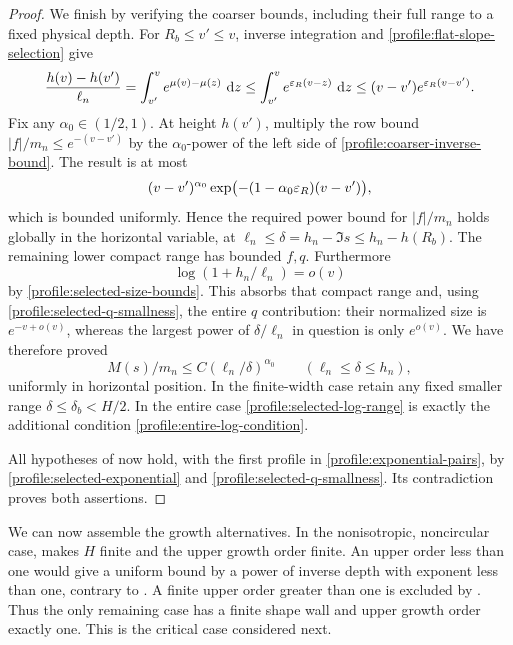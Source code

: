 \begin{proof}
We finish by verifying the coarser bounds, including their full
range to a fixed physical depth. For \(R_b\le v'\le v\),
inverse integration and
\eqref{profile:flat-slope-selection} give
\begin{equation}
 \label{profile:coarser-inverse-bound}
 \frac{h(v)-h(v')}{\ell_n}
 =\int_{v'}^v e^{\mu(v)-\mu(z)}\,\,\mathrm d z
 \le\int_{v'}^v e^{\varepsilon_R(v-z)}\,\,\mathrm d z
 \le (v-v')e^{\varepsilon_R(v-v')}.
\end{equation}
Fix any \(\alpha_0\in(1/2,1)\). At height \(h(v')\), multiply
the row bound \(|f|/m_n\le e^{-(v-v')}\) by the
\(\alpha_0\)-power of the left side of
\eqref{profile:coarser-inverse-bound}. The result is at most
\[
 (v-v')^{\alpha_0}
 \exp\bigl(-(1-\alpha_0\varepsilon_R)(v-v')\bigr),
\]
which is bounded uniformly. Hence the required power bound for
\(|f|/m_n\) holds globally in the horizontal variable, at
\(\ell_n\le\delta=h_n-\Im s\le h_n-h(R_b)\).
The remaining lower compact range has bounded \(f,q\).
Furthermore
\begin{equation}
 \label{profile:selected-log-range}
 \log(1+h_n/\ell_n)=o(v)
\end{equation}
by \eqref{profile:selected-size-bounds}. This absorbs that compact
range and, using \eqref{profile:selected-q-smallness}, the entire
\(q\) contribution: their normalized size is
\(e^{-v+o(v)}\), whereas the largest power of
\(\delta/\ell_n\) in question is only \(e^{o(v)}\).
We have therefore proved
\[
 M(s)/m_n\le C(\ell_n/\delta)^{\alpha_0}
 \qquad(\ell_n\le\delta\le h_n),
\]
uniformly in horizontal position. In the finite-width case retain
any fixed smaller range \(\delta\le\delta_b<H/2\). In the
entire case \eqref{profile:selected-log-range} is exactly the
additional condition \eqref{profile:entire-log-condition}.

All hypotheses of  now hold, with
the first profile in \eqref{profile:exponential-pairs}, by
\eqref{profile:selected-exponential} and
\eqref{profile:selected-q-smallness}. Its contradiction proves
both assertions.
\end{proof}

We can now assemble the growth alternatives. In the nonisotropic,
noncircular case,  makes \(H\)
finite and the upper growth order finite. An upper order less than one
would give a uniform bound by a power of inverse depth with exponent
less than one, contrary to . A finite
upper order greater than one is excluded by
. Thus the only remaining case
has a finite shape wall and upper growth order exactly one. This is the
critical case considered next.

